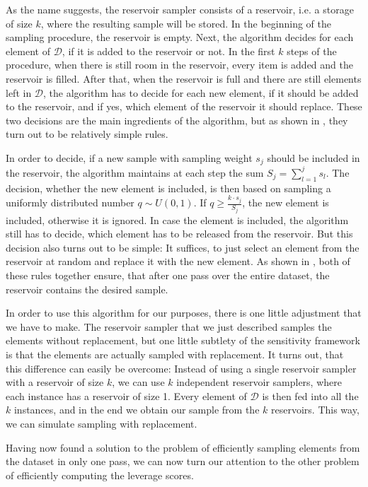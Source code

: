 As the name suggests, the reservoir sampler consists of a reservoir,
i.e. a storage of size $k$, where the resulting sample will be stored.
In the beginning of the sampling procedure, the reservoir is empty.
Next, the algorithm decides for each element of $\mathcal{D}$,
if it is added to the reservoir or not. In the first $k$ steps of the
procedure, when there is still room in the reservoir, every item is
added and the reservoir is filled. After that, when the reservoir is
full and there are still elements left in $\mathcal{D}$,
the algorithm has to decide for each new element, if it should be added
to the reservoir, and if yes,
which element of the reservoir it should replace.
These two decisions are the main ingredients of the algorithm, but
as shown in \cite{reservoir-sampler}, they turn out to be
relatively simple rules.

In order to decide, if a new sample with sampling weight $s_j$ should be
included in the reservoir, the algorithm maintains at each step
the sum $S_j = \sum_{l=1}^j s_l$. The decision, whether
the new element is included, is then based on sampling
a uniformly distributed number $q \sim U(0, 1)$.
If $q \geq \frac{k \cdot s_j}{S_j}$, the new element is included,
otherwise it is ignored. In case the element is included, the
algorithm still has to decide, which element has to be released
from the reservoir. But this decision also turns out to be simple:
It suffices, to just select an element from the reservoir at
random and replace it with the new element.
As shown in \cite{reservoir-sampler}, both of these rules together
ensure, that after one pass over the entire dataset, the
reservoir contains the desired sample.

In order to use this algorithm for our purposes, there is one
little adjustment that we have to make. The reservoir sampler
that we just described samples the elements without replacement,
but one little subtlety of the sensitivity framework is that the
elements are actually sampled with replacement.
It turns out, that this difference can easily be overcome:
Instead of using a single reservoir sampler with a reservoir of
size $k$, we can use $k$ independent reservoir samplers, where
each instance has a reservoir of size 1. Every element of
$\mathcal{D}$ is then fed into all the $k$ instances, and in the
end we obtain our sample from the $k$ reservoirs. This way,
we can simulate sampling with replacement.

Having now found a solution to the problem of efficiently sampling
elements from the dataset in only one pass, we can now turn
our attention to the other problem of efficiently computing
the leverage scores.

